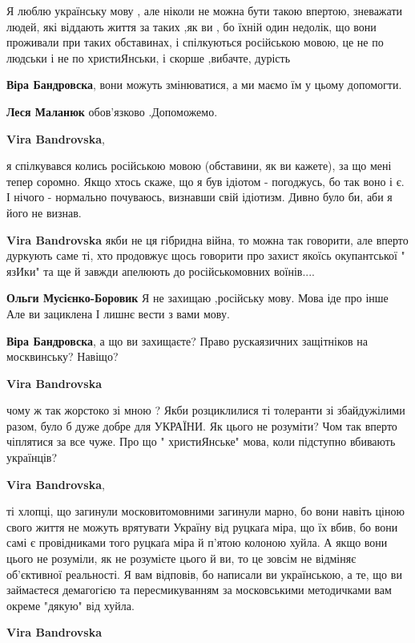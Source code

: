 \begin{itemize}
\begin{itemize}
Я люблю українську мову , але ніколи не можна бути такою впертою, зневажати
людей, які віддають життя за таких ,як ви , бо їхній один недолік, що вони
проживали при таких обставинах, і спілкуються російською мовою, це не по людськи
і не по христиЯнськи, і скорше ,вибачте, дурість

\textbf{Віра Бандровска}, вони можуть змінюватися, а ми маємо їм у цьому допомогти.

\textbf{Леся Маланюк} обов'язково .Допоможемо.

\textbf{Vira Bandrovska}, 

я спілкувався колись російською мовою (обставини, як ви кажете), за що мені
тепер соромно. Якщо хтось скаже, що я був ідіотом - погоджусь, бо так воно і є.
І нічого - нормально почуваюсь, визнавши свій ідіотизм. Дивно було би, аби я
його не визнав.

\textbf{Vira Bandrovska} якби не ця гібридна війна, то можна так говорити, але вперто дуркують саме ті, хто продовжує щось говорити про захист якоїсь окупантської " язИки" та ще й завжди апелюють до російськомовних воїнів....

\textbf{Ольги Мусієнко-Боровик} Я не захищаю ,російську мову. Мова іде про інше Але ви зациклена І лишнє вести з вами мову.

\textbf{Віра Бандровска}, а що ви захищаєте? Право рускаязичних защітніков на москвинську? Навіщо?

\textbf{Vira Bandrovska} 

чому ж так жорстоко зі мною ? Якби розциклилися ті толеранти зі збайдужілими
разом, було б дуже добре для УКРАЇНИ. Як цього не розуміти? Чом так вперто
чіплятися за все чуже. Про що " христиЯнське" мова, коли підступно вбивають
українців?

\textbf{Vira Bandrovska}, 

ті хлопці, що загинули московитомовними загинули марно, бо вони навіть ціною
свого життя не можуть врятувати Україну від руцкаґа міра, що їх вбив, бо вони
самі є провідниками того руцкаґа міра й п'ятою колоною хуйла. А якщо вони цього
не розуміли, як не розумієте цього й ви, то це зовсім не відміняє об'єктивної
реальності. Я вам відповів, бо написали ви українською, а те, що ви займаєтеся
демагогією та пересмикуванням за московськими методичками вам окреме "дякую"
від хуйла.

\textbf{Vira Bandrovska} 


\end{itemize}
\end{itemize}
